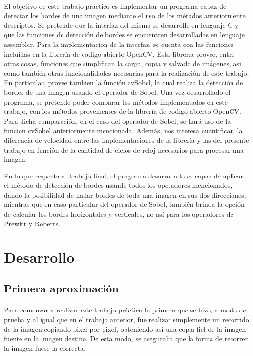 \documentclass[11pt, a4paper]{article}
\begin{document}
\paragraph{}
El objetivo de este trabajo pr\'actico es implementar un programa capaz de detectar los bordes de una imagen mediante el uso de los m\'etodos anteriormente descriptos. Se pretende que la interfaz del mismo se desarrolle en lenguaje C y que las funciones de detecci\'on de bordes se encuentren desarrolladas en lenguaje assembler.
Para la implementacion de la interfaz, se cuenta con las funciones incluidas en la librer\'ia de codigo abierto OpenCV. Esta librer\'ia provee, entre otras cosas, funciones que simplifican la carga, copia y salvado de im\'agenes, asi como tambi\'en otras funcionalidades necesarias para la realizaci\'on de este trabajo. En particular, provee tambien la funci\'on cvSobel, la cual realiza la detecci\'on de bordes de una imagen usando el operador de Sobel.
Una vez desarrollado el programa, se pretende poder comparar los m\'etodos implementados en este trabajo, con los m\'etodos provenientes de la librer\'ia de codigo abierto OpenCV. Para dicha comparaci\'on, en el caso del operador de Sobel, se har\'a uso de la funcion cvSobel anteriormente mencionada. Adem\'as, nos interesa cuantificar, la diferencia de velocidad entre las implementaciones de la librer\'ia y las del presente trabajo en funci\'on de la cantidad de ciclos de reloj necesarios para procesar una imagen.

En lo que respecta al trabajo final, el programa desarrollado es capaz de aplicar el m\'etodo de detecci\'on de bordes usando todos los operadores mencionados, dando la posibilidad de hallar bordes de toda una imagen en sus dos direcciones; mientras que en caso particular del operador de Sobel, tambi\'en brinda la opci\'on de calcular los bordes horizontales y verticales, no as\'i para los operadores de Prewitt y Roberts.

\newpage

\section{Desarrollo}

\subsection{Primera aproximaci\'on}
\paragraph{}
Para comenzar a realizar este trabajo pr\'actico lo primero que se hizo, a modo de prueba y al igual que en el trabajo anterior, fue realizar simplemente un recorrido de la imagen copiando pixel por pixel, obteniendo as\'i una copia fiel de la imagen fuente en la imagen destino. De esta modo, se aseguraba que la forma de recorrer la imagen fuese la correcta.
\end{document}
